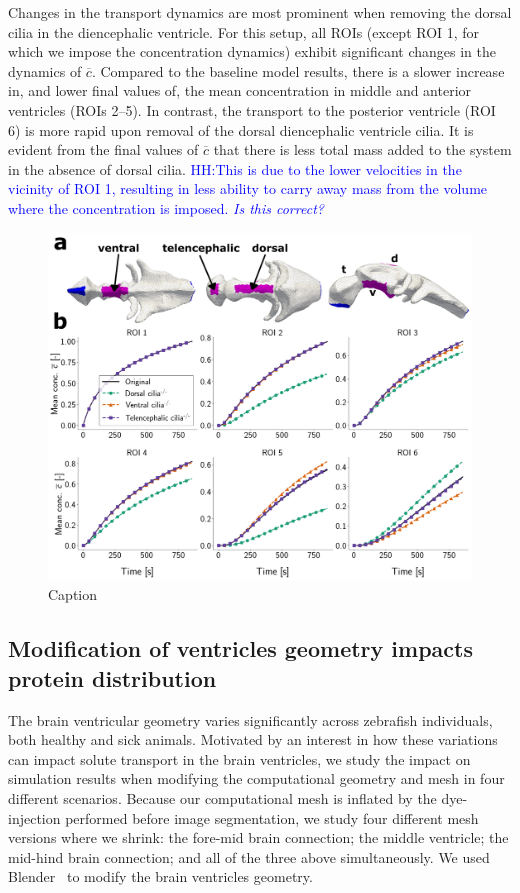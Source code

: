 \documentclass[fleqn]{wlscirep}
\newcommand{\lyng}[1]{\textcolor{blue}{#1}}
\begin{document}
Changes in the transport dynamics are most prominent when removing the dorsal cilia in the diencephalic ventricle. For this setup, all ROIs (except ROI 1, for which we impose the concentration dynamics) exhibit significant changes in the dynamics of $\overline{c}$. Compared to the baseline model results, there is a slower increase in, and lower final values of, the mean concentration in middle and anterior ventricles (ROIs 2--5). In contrast, the transport to the posterior ventricle (ROI 6) is more rapid upon removal of the dorsal diencephalic ventricle cilia. It is evident from the final values of $\overline{c}$ that there is less total mass added to the system in the absence of dorsal cilia. \lyng{HH:This is due to the lower velocities in the vicinity of ROI 1, resulting in less ability to carry away mass from the volume where the concentration is imposed. \emph{Is this correct?}}
\begin{figure}[H]
    \centering
    \includegraphics[width=\textwidth]{graphics/figure5_compare_cilia_modifications.png}
    \caption{Caption}
    \label{fig:figure5_compare_cilia_modifications}
\end{figure}

\subsection*{Modification of ventricles geometry impacts protein distribution}

The brain ventricular geometry varies significantly across zebrafish individuals, both healthy and sick animals. Motivated by an interest in how these variations can impact solute transport in the brain ventricles, we study the impact on simulation results when modifying the computational geometry and mesh in four different scenarios. Because our computational mesh is inflated by the dye-injection performed before image segmentation, we study four different mesh versions where we shrink: the fore-mid brain connection; the middle ventricle; the mid-hind brain connection; and all of the three above simultaneously. We used Blender~\cite{Community2018BlenderPackage} to modify the brain ventricles geometry.
\end{document}
